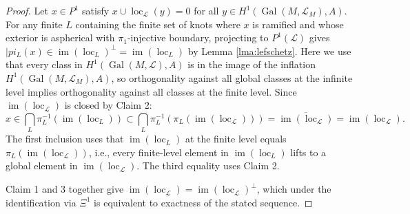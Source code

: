\documentclass[10pt,a4paper]{amsart}
\DeclareMathOperator{\Gal}{\mathrm{Gal}}
\DeclareMathOperator{\im}{\mathrm{im}}
\DeclareMathOperator{\loc}{\mathrm{loc}}
\theoremstyle{plain}
\theoremstyle{definition}
\theoremstyle{remark}
\begin{document}
\begin{proof}
Let $x \in P^1$ satisfy $x \cup \loc_{\mathcal{L}}(y) = 0$ for all $y \in H^1(\Gal(M, \mathcal{L}_M), A)$. For any finite $L$ containing the finite set of knots where $x$ is ramified and whose exterior is aspherical with $\pi_1$-injective boundary, projecting to $P^1(\mathcal L)$ gives $|pi_L(x) \in \im(\loc_L)^\perp = \im(\loc_L)$ by Lemma \ref{lma:lefschetz}. Here we use that every class in $H^1(\Gal(M, \mathcal L), A)$ is in the image of the inflation $H^1(\Gal(M, \mathcal L_M), A)$, so orthogonality against all global classes at the infinite level implies orthogonality against all classes at the finite level.
Since $\im(\loc_{\mathcal{L}})$ is closed by Claim 2:
\begin{equation}
    x \in \bigcap_L\pi_L^{-1}(\im(\loc_L)) \subset \bigcap_L\pi_L^{-1}(\pi_L(\im(\loc_{\mathcal{L}}))) = \overline{\im(\loc_{\mathcal{L}})} = \im(\loc_{\mathcal{L}}).
\end{equation}
The first inclusion uses that $\im(\loc_L)$ at the finite level equals $\pi_L(\im(\loc_{\mathcal{L}}))$, i.e., every finite-level element in $\im(\loc_L)$ lifts to a global element in $\im(\loc_{\mathcal{L}})$. The third equality uses Claim 2.

\medskip

Claim 1 and 3 together give $\im(\loc_{\mathcal{L}}) = \im(\loc_{\mathcal{L}})^\perp$, which under the identification via $\Xi^1$ is equivalent to exactness of the stated sequence.
\end{proof}
\end{document}
